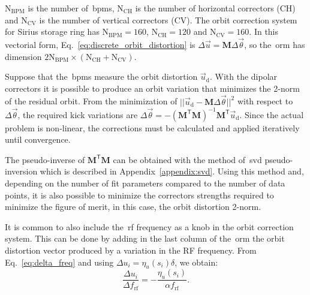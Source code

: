 $\mathrm{N}_{\mathrm{BPM}}$ is the number of~\gls{bpm}s, $\mathrm{N}_{\mathrm{CH}}$ is the number of horizontal correctors (CH) and $\mathrm{N}_{\mathrm{CV}}$ is the number of vertical correctors (CV). The orbit correction system for Sirius storage ring has $\mathrm{N}_{\mathrm{BPM}} = 160$, $\mathrm{N}_{\mathrm{CH}} = 120$ and $\mathrm{N}_{\mathrm{CV}} = 160$.  In this vectorial form, Eq.~\eqref{eq:discrete_orbit_distortion} is $\Delta \vec{u} = \mathbf{M} \Delta \vec{\theta}$, so the~\gls{orm} has dimension $2 \mathrm{N}_{\mathrm{BPM}} \times \left(\mathrm{N}_{\mathrm{CH}} + \mathrm{N}_{\mathrm{CV}}\right)$. 

Suppose that the~\gls{bpm}s measure the orbit distortion $\vec{u}_{\mathrm{d}}$. With the dipolar correctors it is possible to produce an orbit variation that minimizes the 2-norm of the residual orbit. From the minimization of $||\vec{u}_{\mathrm{d}} - \mathbf{M}\Delta \vec{\theta}||^2$ with respect to $\Delta\vec{\theta}$, the required kick variations are $\Delta \vec{\theta} = -\left(\mathbf{M}^{\mathsf{T}}\mathbf{M}\right)^{-1}\mathbf{M}^{\mathsf{T}}\vec{u}_{\mathrm{d}}$. Since the actual problem is non-linear, the corrections must be calculated and applied iteratively until convergence. 

The pseudo-inverse of $\mathbf{M}^{\mathsf{T}}\mathbf{M}$ can be obtained with the method of~\gls{svd} pseudo-inversion which is described in Appendix~\ref{appendix:svd}. Using this method and, depending on the number of fit parameters compared to the number of data points, it is also possible to minimize the correctors strengths required to minimize the figure of merit, in this case, the orbit distortion 2-norm.

It is common to also include the~\gls{rf} frequency as a knob in the orbit correction system. This can be done by adding in the last column of the~\gls{orm} the orbit distortion vector produced by a variation in the RF frequency. From Eq.~\eqref{eq:delta_freq} and using $\Delta u_i = \eta_u(s_i) \delta$, we obtain:
\begin{equation}
    \dfrac{\Delta u_i}{ \Delta f_{\mathrm{rf}}} = - \dfrac{\eta_u(s_i)}{\alpha f_{\mathrm{rf}}}.
    \label{eq:rf_column}
\end{equation}

